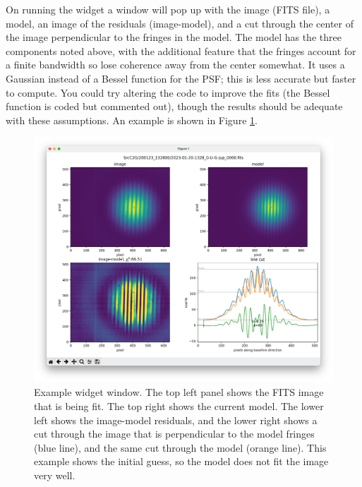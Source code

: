 \documentclass[11pt]{article}
\begin{document}
On running the widget a window will pop up with the image (FITS file), a model, an image of the residuals (image-model), and a cut through the center of the image perpendicular to the fringes in the model. The model has the three components noted above, with the additional feature that the fringes account for a finite bandwidth so lose coherence away from the center somewhat. It uses a Gaussian instead of a Bessel function for the PSF; this is less accurate but faster to compute. You could try altering the code to improve the fits (the Bessel function is coded but commented out), though the results should be adequate with these assumptions. An example is shown in Figure \ref{fig:widget}.

\begin{figure}[h!]
    \centering
    \includegraphics[width=1\textwidth]{widget.png}
    \caption{Example widget window. The top left panel shows the FITS image that is being fit. The top right shows the current model. The lower left shows the image-model residuals, and the lower right shows a cut through the image that is perpendicular to the model fringes (blue line), and the same cut through the model (orange line). This example shows the initial guess, so the model does not fit the image very well.}
    \label{fig:widget}
\end{figure}
\end{document}
